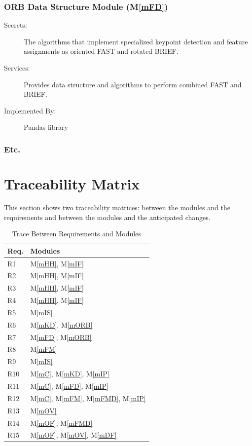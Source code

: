 \documentclass[12pt, titlepage]{article}
\newcommand{\mref}[1]{M\ref{#1}}
\begin{document}
\subsubsection{ORB Data Structure Module (\mref{mFD})}
\begin{description}
\item[Secrets:] The algorithms that implement specialized keypoint detection and feature assignments as oriented-FAST and rotated BRIEF.
\item[Services:] Provides data structure and algorithms to perform combined FAST and BRIEF.
\item[Implemented By:] Pandas library
\end{description}

\subsubsection{Etc.}

\section{Traceability Matrix} \label{SecTM}

This section shows two traceability matrices: between the modules and the
requirements and between the modules and the anticipated changes.

\begin{table}[H]
\centering
\begin{tabular}{p{} p{}}
\toprule
\textbf{Req.} & \textbf{Modules}\\
\midrule
R1 & \mref{mHH}, \mref{mIF}\\
R2 & \mref{mHH}, \mref{mIF}\\
R3 & \mref{mHH}, \mref{mIF}\\
R4 & \mref{mHH}, \mref{mIF}\\
R5 & \mref{mIS}\\
R6 & \mref{mKD}, \mref{mORB}\\
R7 & \mref{mFD}, \mref{mORB}\\
R8 & \mref{mFM}\\
R9 & \mref{mIS}\\
R10 & \mref{mC}, \mref{mKD}, \mref{mIP}\\
R11 & \mref{mC}, \mref{mFD}, \mref{mIP}\\
R12 & \mref{mC}, \mref{mFM}, \mref{mFMD}, \mref{mIP}\\
R13 & \mref{mOV}\\
R14 & \mref{mOF}, \mref{mFMD}\\
R15 & \mref{mOF}, \mref{mOV}, \mref{mDF}\\
\bottomrule
\end{tabular}
\caption{Trace Between Requirements and Modules}
\label{TblRT}
\end{table}
\end{document}
